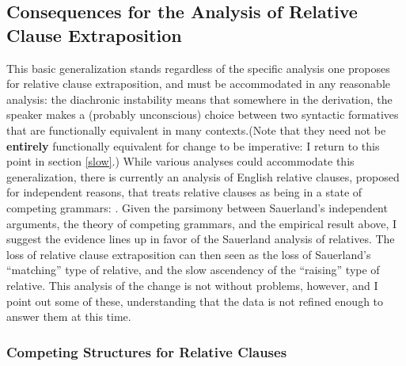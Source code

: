 \subsection{Consequences for the Analysis of Relative Clause Extraposition}

This basic generalization stands regardless of the specific analysis one proposes for relative clause extraposition, and must be accommodated in any reasonable analysis: the diachronic instability means that somewhere in the derivation, the speaker makes a (probably unconscious) choice between two syntactic formatives that are functionally equivalent in many contexts.(Note that they need not be \textbf{entirely} functionally equivalent for change to be imperative: I return to this point in section \ref{slow}.) While various analyses could accommodate this generalization, there is currently an analysis of English relative clauses, proposed for independent reasons, that treats relative clauses as being in a state of competing grammars: \citet{sauerland2003}. Given the parsimony between Sauerland's independent arguments, the theory of competing grammars, and the empirical result above, I suggest the evidence lines up in favor of the Sauerland analysis of relatives. The loss of relative clause extraposition can then seen as the loss of Sauerland's ``matching'' type of relative, and the slow ascendency of the ``raising'' type of relative. This analysis of the change is not without problems, however, and I point out some of these, understanding that the data is not refined enough to answer them at this time.

\subsubsection{Competing Structures for Relative Clauses}


